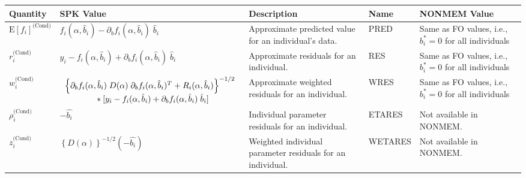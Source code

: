 \documentclass{article}
\begin{document}
\begin{center}
\begin{tabular}{|p{0.75in}|p{3.25in}|p{1.1in}|p{0.85in}|p{1.0in}|}
\hline
\hline
  {\bf Quantity}
    & {\bf SPK Value}
    & {\bf Description}
    & {\bf Name}
    & {\bf NONMEM Value} \\
  \hline
  \hline
  $\mbox{E} \left[ f_i \right]^{\mbox{(Cond)}}$
    & $f_i(\alpha, \hat{b}_i) - \partial_b f_i(\alpha, \hat{b}_i) \; \hat{b}_i$
    & Approximate predicted value for an individual's data.
    & PRED 
    & Same as FO values, i.e., $b^{\ast}_i = 0$ for all individuals\\
  \hline
  $r^{\mbox{(Cond)}}_i$
    & $y_i - f_i(\alpha, \hat{b}_i) + \partial_b f_i(\alpha, \hat{b}_i) \; \hat{b}_i$
    & Approximate residuals for an individual.
    & RES 
    & Same as FO values, i.e., $b^{\ast}_i = 0$ for all individuals\\
  \hline
  $w^{\mbox{(Cond)}}_i$
    & $\begin{array}{l}
        \left\{ \partial_b f_i(\alpha, \hat{b}_i) \;
          D(\alpha) \; \partial_b f_i(\alpha, \hat{b}_i)^T
          + R_i(\alpha, \hat{b}_i) \right\}^{-1/2} \\
        \mbox{\hspace{0.5in}}
        \ast [ y_i - f_i(\alpha, \hat{b}_i) 
           + \partial_b f_i(\alpha, \hat{b}_i) \; \hat{b}_i ]
      \end{array} $
    & Approximate weighted residuals for an individual.
    & WRES 
    & Same as FO values, i.e., $b^{\ast}_i = 0$ for all individuals\\
  \hline
  $\rho^{\mbox{(Cond)}}_i$
    & $-\hat{b_i}$
    & Individual parameter residuals for an individual.
    & ETARES
    & Not available in NONMEM. \\
  \hline
  $z^{\mbox{(Cond)}}_i$
    & $\left\{ D(\alpha) \right\}^{-1/2} ( - \hat{b_i} )$
    & Weighted individual parameter residuals for an individual.
    & WETARES
    & Not available in NONMEM. \\
  \hline
  \hline
\end{tabular}
\end{center}


%
%
\end{document}
